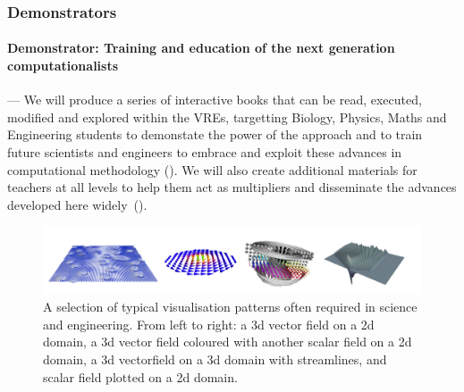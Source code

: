 \subsubsection{Demonstrators}





\paragraph{Demonstrator: Training and education of the next generation
  computationalists} --- We will produce a series of interactive books
that can be read, executed, modified and explored within the
\TheProject VREs, targetting Biology, Physics, Maths and Engineering
students to demonstate the power of the approach and to train future
scientists and engineers to embrace and exploit these advances in
computational methodology (). We will also
create additional materials for teachers at all levels to help them
act as multipliers and disseminate the advances developed here widely~().

\begin{figure}
\includegraphics[width=1.0\textwidth]{Pictures/micromagnetic-and-3d-vis-4x1.pdf}
\caption{\label{fig:3d-plots} A selection of typical visualisation patterns often required in science and engineering. From left to right: a 3d vector field on a 2d domain, a 3d vector field coloured with another scalar field on a 2d domain, a 3d vectorfield on a 3d domain with streamlines, and scalar field plotted on a 2d domain.}
\end{figure}

